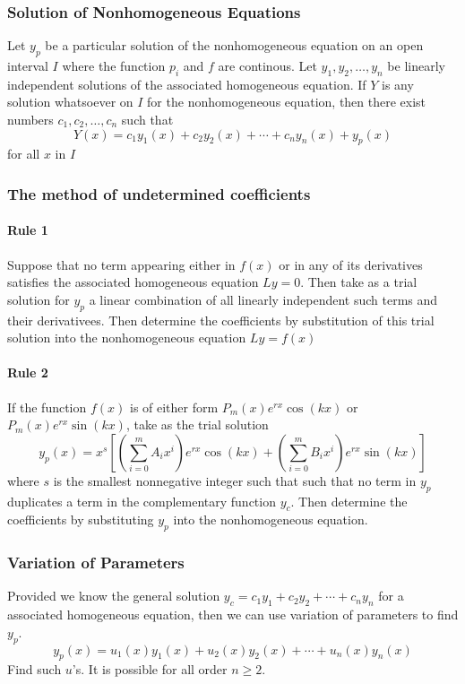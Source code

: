 \documentclass[letter]{article}
\begin{document}
\subsubsection{Solution of Nonhomogeneous Equations}

Let $y_p$ be a particular solution of the nonhomogeneous equation on an open interval $I$ where the function $p_i$ and $f$ are continous. Let $y_1, y_2, \ldots, y_n$ be linearly independent solutions of the associated homogeneous equation. If $Y$ is any solution whatsoever on $I$ for the nonhomogeneous equation, then there exist numbers $c_1, c_2, \ldots, c_n$ such that
\[
Y(x) = c_1y_1(x) + c_2y_2(x) + \cdots + c_ny_n(x) + y_p(x)
\]
for all $x$ in $I$

\subsubsection{The method of undetermined coefficients}


\paragraph{Rule 1}
Suppose that no term appearing either in $f(x)$ or in any of its derivatives satisfies the associated homogeneous equation $Ly=0$. Then take as a trial solution for $y_p$ a linear combination of all linearly independent such terms and their derivativees. Then determine the coefficients by substitution of this trial solution into the nonhomogeneous equation $Ly = f(x)$

\paragraph{Rule 2}
If the function $f(x)$ is of either form $P_m(x)e^{rx}\cos(kx)$ or $P_m(x)e^{rx}\sin(kx)$, take as the trial solution\\
\[
y_p(x) = x^s\left[(\sum_{i=0}^m{A_ix^i})e^{rx}\cos(kx)+(\sum_{i=0}^m{B_ix^i})e^{rx}\sin(kx)\right]
\]
where $s$ is the smallest nonnegative integer such that such that no term in $y_p$ duplicates a term in the complementary function $y_c$. Then determine the coefficients by substituting $y_p$ into the nonhomogeneous equation.

\subsubsection{Variation of Parameters}
Provided we know the general solution $y_c = c_1y_1 + c_2y_2 + \cdots + c_ny_n$ for a associated homogeneous equation, then we can use variation of parameters to find $y_p$.
\[
y_p(x) = u_1(x)y_1(x) + u_2(x)y_2(x) + \cdots + u_n(x)y_n(x)
\]
Find such $u$'s. It is possible for all order $n\geq 2$.
\end{document}
